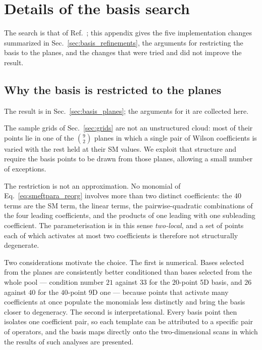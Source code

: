 \clearpage
\section{Details of the basis search}
\label{sec:appendix_basis_search}

The search is that of Ref.~\cite{HH_nonggf_R5}; this appendix gives the five
implementation changes summarized in Sec.~\ref{sec:basis_refinements}, the arguments for
restricting the basis to the planes, and the changes that were tried and did not improve
the result.

\subsection{Why the basis is restricted to the planes}
\label{sec:appendix_basis_planes}

The result is in Sec.~\ref{sec:basis_planes}; the arguments for it are collected here.

The sample grids of Sec.~\ref{sec:grids} are not an unstructured cloud: most of
their points lie in one of the $\binom{9}{2}$ planes in which a single pair of
Wilson coefficients is varied with the rest held at their SM values.
We exploit that structure and require the basis points to be drawn from those
planes, allowing a small number of exceptions.

The restriction is not an approximation. No monomial of
Eq.~\eqref{eq:smeftpara_reorg} involves more than two distinct coefficients: the
$40$ terms are the SM term, the linear terms, the pairwise-quadratic
combinations of the four leading coefficients, and the products of one leading
with one subleading coefficient. The parameterisation is in this sense
\emph{two-local}, and a set of points each of which activates at most two
coefficients is therefore not structurally degenerate.

Two considerations motivate the choice. The first is numerical. Bases selected
from the planes are consistently better conditioned than bases selected from the
whole pool --- condition number $21$ against $33$ for the $20$-point 5D basis,
and $26$ against $40$ for the $40$-point 9D one --- because points that activate
many coefficients at once populate the monomials less distinctly and bring the
basis closer to degeneracy. The second is interpretational. Every basis point
then isolates one coefficient pair, so each template can be attributed to a
specific pair of operators, and the basis maps directly onto the
two-dimensional scans in which the results of such analyses are presented.

